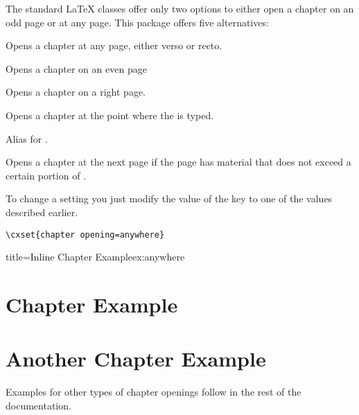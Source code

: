 The standard LaTeX classes offer only two options to either open a chapter on an odd page or at any page. This package offers five alternatives:


\begin{marglist}
\item [any] Opens a chapter at any page, either verso or recto.
\item [left] Opens a chapter on an even page
\item [right] Opens a chapter on a right page.
\item [anywhere] Opens a chapter at the point where the  is typed.
\item [none] Alias for .
\item [ifafter] Opens a chapter at the next page if the page has material that does not exceed a certain portion of .
\end{marglist}

To change a setting you just modify the value of the key  to one of the values described earlier.

\begin{tcolorbox}
\begin{lstlisting}
\cxset{chapter opening=anywhere}
\end{lstlisting}
\end{tcolorbox}

\@specialfalse
{}
\begin{texexample}{title=Inline Chapter Example}{ex:anywhere}

\lipsum[2]
\chapter{Chapter Example}
\lipsum[3]
\chapter{Another Chapter Example}
\lipsum[4]
\end{texexample}



\addtocounter{chapter}{-1}

Examples for other types of chapter openings follow in the rest of the documentation.

